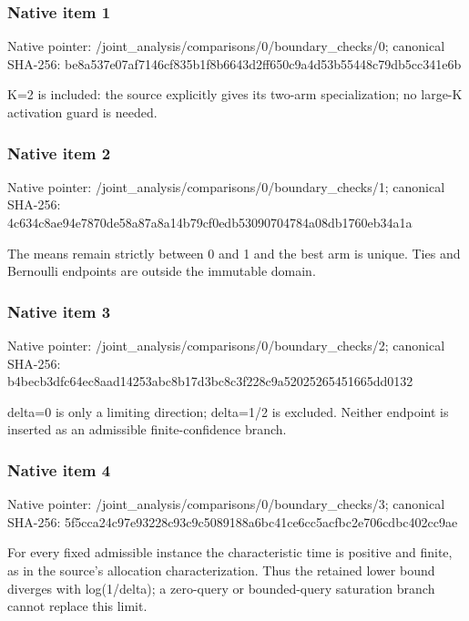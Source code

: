 \documentclass[10pt,a4paper]{article}
\begin{document}
\subsubsection{Native item 1}
Native pointer: /joint\_\allowbreak{}analysis/comparisons/0/boundary\_\allowbreak{}checks/0; canonical SHA-256: be8a537e07af7146cf835b1f8b6643d2ff650c9a4d53b55448c79db5cc341e6b

\begingroup\raggedright\sloppy K=\allowbreak{}2 is included:\allowbreak{} the source explicitly gives its two-arm specialization;\allowbreak{} no large-K activation guard is needed.\par\endgroup

\subsubsection{Native item 2}
Native pointer: /joint\_\allowbreak{}analysis/comparisons/0/boundary\_\allowbreak{}checks/1; canonical SHA-256: 4c634c8ae94e7870de58a87a8a14b79cf0edb53090704784a08db1760eb34a1a

\begingroup\raggedright\sloppy The means remain strictly between 0 and 1 and the best arm is unique. Ties and Bernoulli endpoints are outside the immutable domain.\par\endgroup

\subsubsection{Native item 3}
Native pointer: /joint\_\allowbreak{}analysis/comparisons/0/boundary\_\allowbreak{}checks/2; canonical SHA-256: b4becb3dfc64ec8aad14253abc8b17d3bc8c3f228c9a52025265451665dd0132

\begingroup\raggedright\sloppy delta=\allowbreak{}0 is only a limiting direction;\allowbreak{} delta=\allowbreak{}1/\allowbreak{}2 is excluded. Neither endpoint is inserted as an admissible finite-confidence branch.\par\endgroup

\subsubsection{Native item 4}
Native pointer: /joint\_\allowbreak{}analysis/comparisons/0/boundary\_\allowbreak{}checks/3; canonical SHA-256: 5f5cca24c97e93228c93c9c5089188a6bc41ce6cc5acfbc2e706cdbc402cc9ae

\begingroup\raggedright\sloppy For every fixed admissible instance the characteristic time is positive and finite,\allowbreak{} as in the source's allocation characterization. Thus the retained lower bound diverges with log(1/\allowbreak{}delta);\allowbreak{} a zero-query or bounded-query saturation branch cannot replace this limit.\par\endgroup
\end{document}
